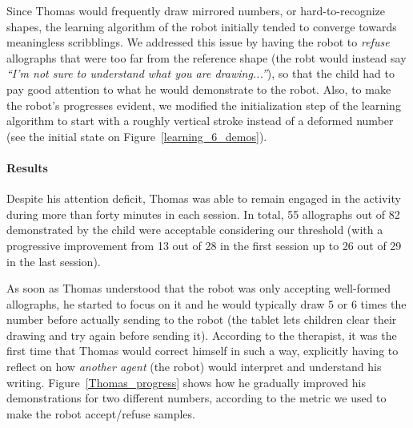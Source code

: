 \documentclass{article}
\begin{document}

Since Thomas would frequently draw mirrored numbers, or hard-to-recognize
shapes, the learning algorithm of the robot initially tended to converge towards
meaningless scribblings. We addressed this issue by having the robot to
\emph{refuse} allographs that were too far from the reference shape (the robt
would instead say \emph{``I'm
not sure to understand what you are drawing...''}), so that the child had to
pay good attention to what he would demonstrate to the robot. Also, to make
the robot's progresses evident, we modified the initialization step of the
learning algorithm to start with a roughly vertical stroke instead of a
deformed number (see the initial state on Figure~\ref{learning_6_demos}).

%

\paragraph{Results}

Despite his attention deficit, Thomas was able to remain engaged in the activity during more than
forty minutes in each session. In total, 55 allographs out of 82 
demonstrated by the child were acceptable considering our threshold (with a
progressive improvement from 13 out of 28 in the first session up to 26 out
of 29 in the last session).

As soon as Thomas understood that the robot was only accepting well-formed
allographs, he started to focus on it and he would typically draw 5 or 6 times
the number before actually sending to the robot (the tablet lets children
clear their drawing and try again before sending it). According to
the therapist, it was the first time that Thomas would correct himself in such a
way, explicitly having to reflect on how \emph{another agent} (the robot) would
interpret and understand his writing. Figure~\ref{Thomas_progress} shows how
he gradually improved his demonstrations for two different numbers, according to the
metric we used to make the robot accept/refuse samples.
\end{document}
